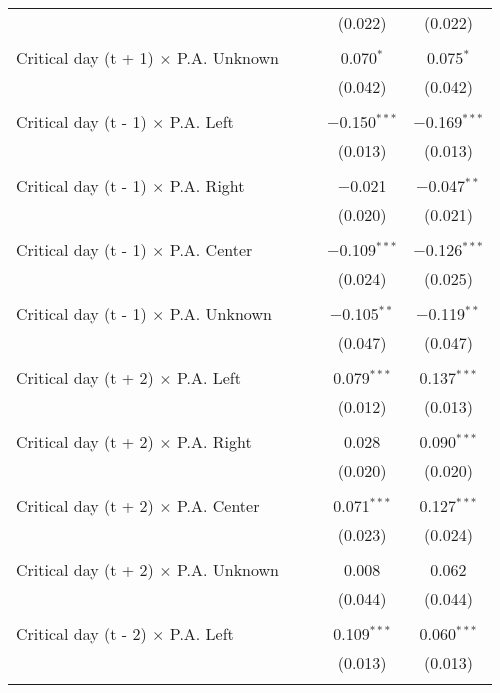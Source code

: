 \documentclass[
]{article}
\begin{document}
\begin{table}[!htbp]
{\begin{tabular}{@{\extracolsep{5pt}}lcccc}
  &  &  & (0.022) & (0.022) \\ 
  & & & & \\ 
 Critical day (t + 1) $\times$ P.A. Unknown &  &  & 0.070$^{*}$ & 0.075$^{*}$ \\ 
  &  &  & (0.042) & (0.042) \\ 
  & & & & \\ 
 Critical day (t - 1) $\times$ P.A. Left &  &  & $-$0.150$^{***}$ & $-$0.169$^{***}$ \\ 
  &  &  & (0.013) & (0.013) \\ 
  & & & & \\ 
 Critical day (t - 1) $\times$ P.A. Right &  &  & $-$0.021 & $-$0.047$^{**}$ \\ 
  &  &  & (0.020) & (0.021) \\ 
  & & & & \\ 
 Critical day (t - 1) $\times$ P.A. Center &  &  & $-$0.109$^{***}$ & $-$0.126$^{***}$ \\ 
  &  &  & (0.024) & (0.025) \\ 
  & & & & \\ 
 Critical day (t - 1) $\times$ P.A. Unknown &  &  & $-$0.105$^{**}$ & $-$0.119$^{**}$ \\ 
  &  &  & (0.047) & (0.047) \\ 
  & & & & \\ 
 Critical day (t + 2) $\times$ P.A. Left &  &  & 0.079$^{***}$ & 0.137$^{***}$ \\ 
  &  &  & (0.012) & (0.013) \\ 
  & & & & \\ 
 Critical day (t + 2) $\times$ P.A. Right &  &  & 0.028 & 0.090$^{***}$ \\ 
  &  &  & (0.020) & (0.020) \\ 
  & & & & \\ 
 Critical day (t + 2) $\times$ P.A. Center &  &  & 0.071$^{***}$ & 0.127$^{***}$ \\ 
  &  &  & (0.023) & (0.024) \\ 
  & & & & \\ 
 Critical day (t + 2) $\times$ P.A. Unknown &  &  & 0.008 & 0.062 \\ 
  &  &  & (0.044) & (0.044) \\ 
  & & & & \\ 
 Critical day (t - 2) $\times$ P.A. Left &  &  & 0.109$^{***}$ & 0.060$^{***}$ \\ 
  &  &  & (0.013) & (0.013) \\ 
  & & & & \\ 

\end{tabular}}
\end{table}
\end{document}
